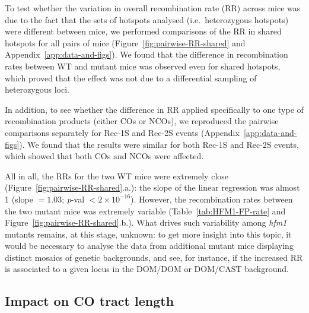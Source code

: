 To test whether the variation in overall recombination rate (RR) across mice was due to the fact that the sets of hotspots analysed (i.e.\ heterozygous hotspots) were different between mice, we performed comparisons of the RR in shared hotspots for all pairs of mice (Figure~\ref{fig:pairwise-RR-shared} and Appendix~\ref{app:data-and-figs}).
We found that the difference in recombination rates between WT and mutant mice was observed even for shared hotspots, which proved that the effect was not due to a differential sampling of heterozygous loci.

In addition, to see whether the difference in RR applied specifically to one type of recombination products (either COs or NCOs), we reproduced the pairwise comparisons separately for Rec-1S and Rec-2S events (Appendix~\ref{app:data-and-figs}).
We found that the results were similar for both Rec-1S and Rec-2S events, which showed that both COs and NCOs were affected.

All in all, the RRs for the two WT mice were extremely close (Figure~\ref{fig:pairwise-RR-shared}.a.): the slope of the linear regression was almost 1 (slope $=1.03$; \textit{p}-val $<2 \times 10^{-16}$).
However, the recombination rates between the two mutant mice was extremely variable (Table~\ref{tab:HFM1-FP-rate} and Figure~\ref{fig:pairwise-RR-shared}.b.).
What drives such variability among \textit{hfm1} mutants remains, at this stage, unknown: to get more insight into this topic, it would be necessary to analyse the data from additional mutant mice displaying distinct mosaics of genetic backgrounds, and see, for instance, if the increased RR is associated to a given locus in the DOM/DOM or DOM/CAST background.


\subsection{Impact on CO tract length}


